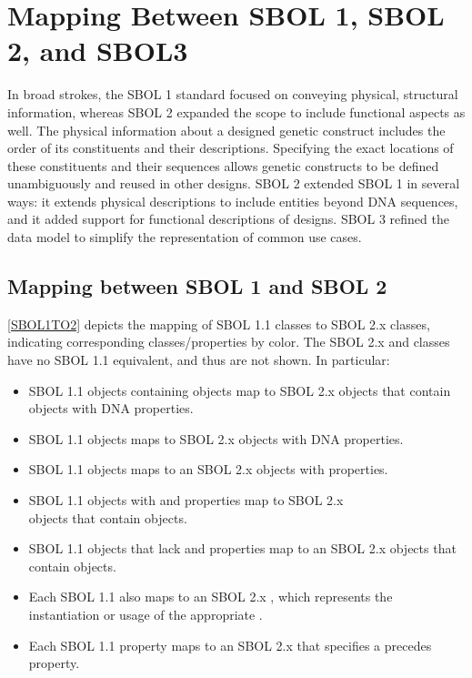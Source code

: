 \section{Mapping Between SBOL 1, SBOL 2, and SBOL3}
\label{sec:mapping}

In broad strokes, the SBOL 1 standard focused on conveying physical, structural information, whereas SBOL 2 expanded the scope to include functional aspects as well.  
The physical information about a designed genetic construct includes the order of its constituents and their descriptions. 
Specifying the exact locations of these constituents and their sequences allows genetic constructs to be defined unambiguously and reused in other designs. 
SBOL 2 extended SBOL 1 in several ways: it extends physical descriptions to include entities beyond DNA sequences, and it added support for functional descriptions of designs.  
SBOL 3 refined the data model to simplify the representation of common use cases.

\subsection{Mapping between SBOL 1 and SBOL 2}

\ref{SBOL1TO2} depicts the mapping of SBOL 1.1 classes to SBOL 2.x classes, indicating corresponding classes/properties by color.
The SBOL 2.x  and  classes have no SBOL 1.1 equivalent, and thus are not shown.
In particular:
\begin{itemize}
\item SBOL 1.1  objects containing  objects map to SBOL 2.x  objects that contain  objects with DNA  properties.
\item SBOL 1.1  objects maps to SBOL 2.x  objects with DNA  properties.
\item SBOL 1.1  objects maps to an SBOL 2.x  objects with   properties.
\item SBOL 1.1  objects with  and  properties map to SBOL 2.x\\
 objects that contain  objects.
\item SBOL 1.1  objects that lack  and  properties map to an SBOL 2.x  objects that contain  objects.
\item Each SBOL 1.1  also maps to an SBOL 2.x , which represents the instantiation or usage of the appropriate .
\item Each SBOL 1.1  property maps to an SBOL 2.x  that specifies a precedes  property.
\end{itemize}

